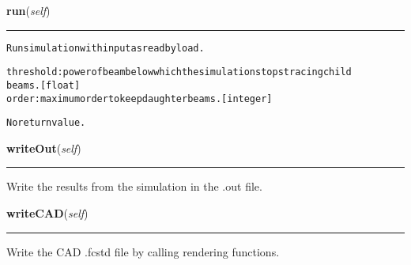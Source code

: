 \hspace{.8\funcindent}\begin{boxedminipage}{\funcwidth}

    \raggedright \textbf{run}(\textit{self})

    \vspace{-1.5ex}

    \rule{\textwidth}{0.5\fboxrule}
\setlength{\parskip}{2ex}
\begin{alltt}
Run simulation with input as read by load.

threshold: power of beam below which the simulation stops tracing child
            beams. [float]
order: maximum order to keep daughter beams. [integer]

No return value.
\end{alltt}

\setlength{\parskip}{1ex}
    \end{boxedminipage}

    \label{theia:running:simulation:Simulation:writeOut}

    \vspace{0.5ex}

\hspace{.8\funcindent}\begin{boxedminipage}{\funcwidth}

    \raggedright \textbf{writeOut}(\textit{self})

    \vspace{-1.5ex}

    \rule{\textwidth}{0.5\fboxrule}
\setlength{\parskip}{2ex}
    Write the results from the simulation in the .out file.

\setlength{\parskip}{1ex}
    \end{boxedminipage}

    \label{theia:running:simulation:Simulation:writeCAD}

    \vspace{0.5ex}

\hspace{.8\funcindent}\begin{boxedminipage}{\funcwidth}

    \raggedright \textbf{writeCAD}(\textit{self})

    \vspace{-1.5ex}

    \rule{\textwidth}{0.5\fboxrule}
\setlength{\parskip}{2ex}
    Write the CAD .fcstd file by calling rendering functions.

\setlength{\parskip}{1ex}
    \end{boxedminipage}


